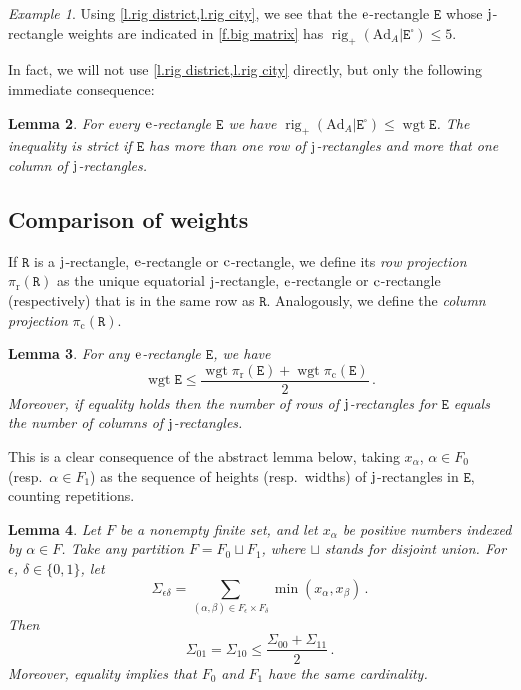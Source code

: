\documentclass[10pt, a4paper]{amsart}
\theoremstyle{plain}
\newtheorem{lemma}{Lemma}[section]
\theoremstyle{definition}
\theoremstyle{remark}
\theoremstyle{note}
\newtheorem{example}[lemma]{Example}
\numberwithin{equation}{section}
\begin{document}
\begin{example}\label{ex.continued}
Using \cref{l.rig district,l.rig city},
we see that the $\rm e$-rectangle ${\mathtt{E}}$ 
whose $\rm j$-rectangle weights are indicated in \cref{f.big matrix}
has $\operatorname{rig}_+ ({\mathrm{Ad}}_A | {\mathtt{E}}^\square) \le 5$. 
\end{example}

In fact, we will not use \cref{l.rig district,l.rig city} directly, 
but only the following immediate consequence:
\begin{lemma}\label{l.crude rig city}
For every $\rm e$-rectangle ${\mathtt{E}}$ we have $\operatorname{rig}_+ ({\mathrm{Ad}}_A | {\mathtt{E}}^\square) \le \operatorname{wgt} {\mathtt{E}}$.
The inequality is strict if ${\mathtt{E}}$ has more than one row of $\rm j$-rectangles and more that one column of $\rm j$-rectangles.
\end{lemma}

\subsection{Comparison of weights}

If ${\mathtt{R}}$ is a $\rm j$-rectangle, $\rm e$-rectangle or $\rm c$-rectangle,
we define its \emph{row projection} ${\pi_\mathrm{r}}({\mathtt{R}})$
as the unique equatorial $\rm j$-rectangle, $\rm e$-rectangle or $\rm c$-rectangle (respectively)
that is in the same row as ${\mathtt{R}}$.
Analogously, we define the \emph{column projection} ${\pi_\mathrm{c}}({\mathtt{R}})$.

\begin{lemma}\label{l.city proj}
For any $\rm e$-rectangle ${\mathtt{E}}$, we have
$$
\operatorname{wgt} {\mathtt{E}} \le \frac{\operatorname{wgt} {\pi_\mathrm{r}}({\mathtt{E}}) + \operatorname{wgt} {\pi_\mathrm{c}}({\mathtt{E}})}{2} \, .
$$
Moreover, if equality holds then 
the number of rows of $\rm j$-rectangles for ${\mathtt{E}}$ equals the number of columns of $\rm j$-rectangles.
\end{lemma}

This is a clear consequence of the abstract lemma below,
taking $x_\alpha$, $\alpha\in F_0$ (resp.\ $\alpha\in F_1$) 
as the sequence of heights (resp.\ widths) of $\rm j$-rectangles in ${\mathtt{E}}$,
counting repetitions.

\begin{lemma}\label{l.combin}
Let $F$ be a nonempty finite set,
and let $x_\alpha$ be positive numbers indexed by $\alpha \in F$.
Take any partition $F = F_0 \sqcup F_1$, where $\sqcup$ stands for disjoint union.
For $\epsilon$, $\delta \in \{0,1\}$, let
$$
\Sigma_{\epsilon\delta} = \sum_{(\alpha,\beta) \in F_\epsilon \times F_\delta} \min(x_\alpha, x_\beta) \, .
$$
Then
$$
\Sigma_{01} = \Sigma_{10} \le \frac{\Sigma_{00} + \Sigma_{11}}{2} \, .
$$
Moreover, equality implies that $F_0$ and $F_1$ have the same cardinality.
\end{lemma}
\end{document}
